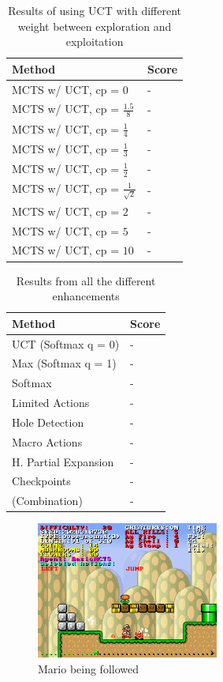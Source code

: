 \documentclass[10pt,a4paper]{article}
\begin{document}
\begin{table}[h]
	\centering
	\begin{tabular}{| l | l |}
		\hline
		\textbf{Method} & \textbf{Score} \\ \hline
		MCTS w/ UCT, cp = 0			 			& - \\ \hline
		MCTS w/ UCT, cp = $\frac{1.5}{8}$		& - \\ \hline
		MCTS w/ UCT, cp = $\frac{1}{4}$		 	& - \\ \hline
		MCTS w/ UCT, cp = $\frac{1}{3}$		 	& - \\ \hline
		MCTS w/ UCT, cp = $\frac{1}{2}$		 	& - \\ \hline
		MCTS w/ UCT, cp = $\frac{1}{\sqrt{2}}$	& - \\ \hline
		MCTS w/ UCT, cp = $2$			 		& - \\ \hline
		MCTS w/ UCT, cp = $5$			 		& - \\ \hline
		MCTS w/ UCT, cp = $10$		 			& - \\ \hline
	\end{tabular}
	\caption{Results of using UCT with different weight between exploration and exploitation}
	\label{tab:uct_cp_results}
\end{table}

\begin{table}[h]
	\centering
	\begin{tabular}{| l | l |}
		\hline
		\textbf{Method} & \textbf{Score} \\ \hline
		UCT (Softmax q = 0)				& - \\ \hline
		Max (Softmax q = 1)				& - \\ \hline
		Softmax							& - \\ \hline
		Limited Actions		 			& - \\ \hline
		Hole Detection		 			& - \\ \hline
		Macro Actions		 			& - \\ \hline
		H. Partial Expansion			& - \\ \hline
		Checkpoints						& - \\ \hline
		(Combination)					& - \\ \hline
	\end{tabular}
	\caption{Results from all the different enhancements}
	\label{tab:method_results}
\end{table}


\begin{figure}[h]
\centering
\includegraphics[width=6cm]{Forfulgt.png}
\caption{Mario being followed}
\label{fig:followed}
\end{figure}
\end{document}
